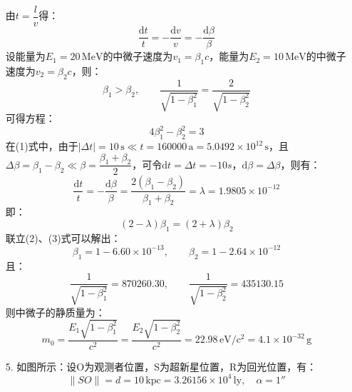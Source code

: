 \documentclass[a4paper,fontset=none]{ctexart}
\begin{document}
\begin{itemize}
        由$t = \dfrac{l}{v}$得：
        \begin{equation}
        \frac{\mathrm{d}t}{t} = -\frac{\mathrm{d}v}{v} = -\frac{\mathrm{d}\beta}{\beta}
        \end{equation}
        设能量为$E_1 = 20\,\mathrm{MeV}$的中微子速度为$v_1 = \beta_1 c$，能量为$E_2 = 10\,\mathrm{MeV}$的中微子速度为$v_2 = \beta_2 c$，则：
        \[
        \beta_1 > \beta_2,\qquad \frac{1}{\sqrt{1-\beta_1^2}} = \frac{2}{\sqrt{1-\beta_2^2}}
        \]
        可得方程：
        \begin{equation}
            4\beta_1^2 - \beta_2^2 = 3
        \end{equation}
        在(1)式中，由于$|\Delta t| = 10\,\mathrm{s} \ll t = 160000\,\mathrm{a} = 5.0492\times10^{12}\,\mathrm{s}$，且$\Delta \beta = \beta_1 - \beta_2 \ll \beta = \dfrac{\beta_1 + \beta_2}{2}$，可令$\mathrm{d}t = \Delta t = -10s$，$\mathrm{d}\beta = \Delta\beta$，则有：
        \[
        \frac{\mathrm{d}t}{t} = -\frac{\mathrm{d}\beta}{\beta} = \frac{2(\beta_1 - \beta_2)}{\beta_1 + \beta_2} = \lambda = 1.9805\times10^{-12}
        \]
        即：
        \begin{equation}
            (2-\lambda)\beta_1 = (2+\lambda)\beta_2
        \end{equation}
        联立(2)、(3)式可以解出：
        \[
        \beta_1 = 1 - 6.60\times10^{-13},\qquad
        \beta_2 = 1 - 2.64\times10^{-12}
        \]
        且：
        \[
        \frac{1}{\sqrt{1-\beta_1^2}} = 870260.30,\qquad
        \frac{1}{\sqrt{1-\beta_2^2}} = 435130.15
        \]
        则中微子的静质量为：
        \[
        m_0 = \frac{E_1\sqrt{1-\beta_1^2}}{c^2} = \frac{E_2\sqrt{1-\beta_2^2}}{c^2} = 22.98\,\mathrm{eV/c^2} = 4.1\times10^{-32}\,\mathrm{g}
        \]

        \item[5.]
        如图所示：设O为观测者位置，S为超新星位置，R为回光位置，有：
        \[
        \|SO\| = d = 10\,\mathrm{kpc} = 3.26156\times10^4\,\mathrm{ly},\quad \alpha = 1''
        \]

        \begin{center}
        \end{center}


\end{itemize}
\end{document}
